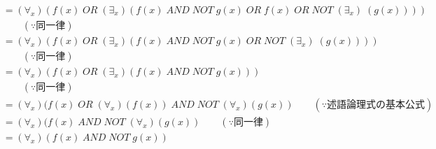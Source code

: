 \documentclass[dvipdfmx,10pt, a4j]{jarticle}
\theoremstyle{definition}
\begin{document}
\begin{align*}
        &= (\forall_x)(f(x)\; OR\; (\exists_x)(f(x)\; AND\; NOT\; g(x)\; OR\; f(x)\; OR\; NOT\; (\exists_x)\; (g(x))))\\ &\qquad (\because 同一律)\\
        &= (\forall_x)(f(x)\; OR\; (\exists_x)(f(x)\; AND\; NOT\; g(x)\; OR\; NOT\; (\exists_x)\; (g(x))))\\ &\qquad (\because 同一律)\\
        &= (\forall_x)(f(x)\; OR\; (\exists_x)(f(x)\; AND\; NOT\; g(x)))\\ &\qquad (\because 同一律)\\
        &= (\forall_x)(f(x)\; OR\; (\forall_x)(f(x))\; AND\; NOT\;(\forall_x)(g(x)) \qquad (\because 述語論理式の基本公式)\\
        &= (\forall_x)(f(x)\; AND\; NOT\;(\forall_x)(g(x)) \qquad (\because 同一律)\\
        &= (\forall_x)(f(x)\; AND\; NOT\; g(x))\\
    \end{align*}
    
\end{document}

